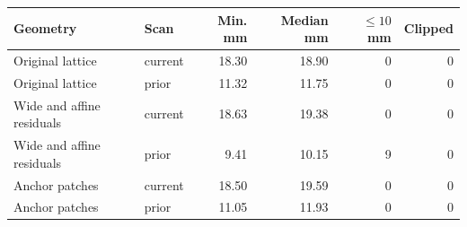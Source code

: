 \begin{tabular}{@{}llrrrr@{}}
\toprule
Geometry & Scan & Min. mm & Median mm & $\leq10$ mm & Clipped \\
\midrule
Original lattice & current & 18.30 & 18.90 & 0 & 0 \\
Original lattice & prior & 11.32 & 11.75 & 0 & 0 \\
Wide and affine residuals & current & 18.63 & 19.38 & 0 & 0 \\
Wide and affine residuals & prior & 9.41 & 10.15 & 9 & 0 \\
Anchor patches & current & 18.50 & 19.59 & 0 & 0 \\
Anchor patches & prior & 11.05 & 11.93 & 0 & 0 \\
\bottomrule
\end{tabular}

